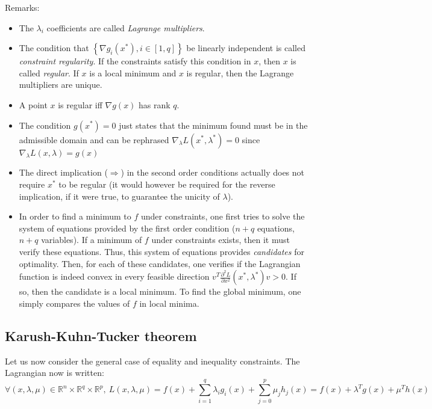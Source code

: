\documentclass{article}
\begin{document}
\noindent Remarks:
\begin{itemize}
\item The $\lambda_i$ coefficients are called \emph{Lagrange multipliers}.
\item The condition that $\left\{ \nabla g_i(x^*), i\in
[1,q] \right\}$ be linearly independent is called \emph{constraint regularity}. If the constraints satisfy this condition in $x$, then $x$ is called \emph{regular}. If $x$ is a local minimum and $x$ is regular, then the Lagrange multipliers are unique.
\item A point $x$ is regular iff $\nabla g(x)$ has rank $q$.
\item The condition $g(x^*)=0$ just states that the minimum found must be in the admissible domain and can be rephrased $\nabla_\lambda L(x^*,\lambda^*)=0$ since $\nabla_\lambda L(x,\lambda)=g(x)$
\item The direct implication ($\Rightarrow$) in the second order conditions actually does not require $x^*$ to be regular (it would however be required for the reverse implication, if it were true, to guarantee the unicity of $\lambda$).
\item In order to find a minimum to $f$ under constraints, one first tries to solve the system of equations provided by the first order condition ($n+q$ equations, $n+q$ variables). If a minimum of $f$ under constraints exists, then it must verify these equations. Thus, this system of equations provides \emph{candidates} for optimality. Then, for each of these candidates, one verifies if the Lagrangian function is indeed convex in every feasible direction $v^T \frac{\partial^2 L}{\partial x^2}(x^*,\lambda^*) v > 0$. If so, then the candidate is a local minimum. To find the global minimum, one simply compares the values of $f$ in local minima.
\end{itemize}

\subsection{Karush-Kuhn-Tucker theorem}

Let us now consider the general case of equality and inequality constraints. The Lagrangian now is written:
\begin{equation*}
\forall (x,\lambda,\mu)\in \mathbb{R}^n \times \mathbb{R}^q\times\mathbb{R}^p, \ 
L(x,\lambda,\mu) = f(x) +
\sum\limits_{i=1}^q \lambda_i g_i(x) + \sum\limits_{j=0}^p \mu_jh_j(x) = f(x) +
\lambda^T g(x) + \mu^T h(x)
\end{equation*}
\end{document}
